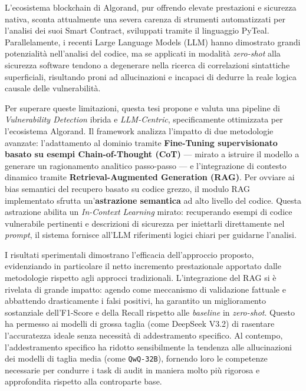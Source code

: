 L'ecosistema blockchain di Algorand, pur offrendo elevate prestazioni e sicurezza nativa, sconta attualmente una severa carenza di strumenti automatizzati per l'analisi dei suoi Smart Contract, sviluppati tramite il linguaggio PyTeal. Parallelamente, i recenti Large Language Models (LLM) hanno dimostrato grandi potenzialità nell'analisi del codice, ma se applicati in modalità \textit{zero-shot} alla sicurezza software tendono a degenerare nella ricerca di correlazioni sintattiche superficiali, risultando proni ad allucinazioni e incapaci di dedurre la reale logica causale delle vulnerabilità. 


Per superare queste limitazioni, questa tesi propone e valuta una pipeline di \textit{Vulnerability Detection} ibrida e \textit{LLM-Centric}, specificamente ottimizzata per l'ecosistema Algorand. Il framework analizza l'impatto di due metodologie avanzate: l'adattamento al dominio tramite \textbf{Fine-Tuning supervisionato basato su esempi Chain-of-Thought (CoT)} --- mirato a istruire il modello a generare un ragionamento analitico passo-passo --- e l'integrazione di contesto dinamico tramite \textbf{Retrieval-Augmented Generation (RAG)}. Per ovviare ai bias semantici del recupero basato su codice grezzo, il modulo RAG implementato sfrutta un'\textbf{astrazione semantica} ad alto livello del codice. Questa astrazione abilita un \textit{In-Context Learning} mirato: recuperando esempi di codice vulnerabile pertinenti e descrizioni di sicurezza per iniettarli direttamente nel \textit{prompt}, il sistema fornisce all'LLM riferimenti logici chiari per guidarne l'analisi.

I risultati sperimentali dimostrano l'efficacia dell'approccio proposto, evidenziando in particolare il netto incremento prestazionale apportato dalle metodologie rispetto agli approcci tradizionali. L'integrazione del RAG si è rivelata di grande impatto: agendo come meccanismo di validazione fattuale e abbattendo drasticamente i falsi positivi, ha garantito un miglioramento sostanziale dell'F1-Score e della Recall rispetto alle \textit{baseline} in \textit{zero-shot}. Questo ha permesso ai modelli di grossa taglia (come DeepSeek V3.2) di rasentare l'accuratezza ideale senza necessità di addestramento specifico. Al contempo, l'addestramento specifico ha ridotto sensibilmente la tendenza alle allucinazioni dei modelli di taglia media (come \texttt{QwQ-32B}), fornendo loro le competenze necessarie per condurre i task di audit in maniera molto più rigorosa e approfondita rispetto alla controparte base.

